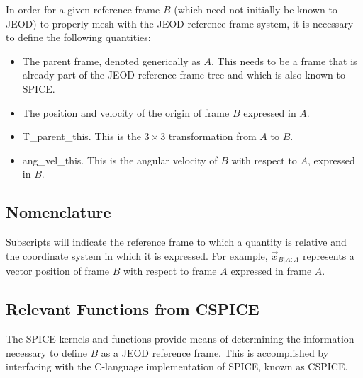 In order for a given reference frame $B$ (which need not initially be known
to JEOD) to properly mesh with the JEOD reference frame system, it is necessary
to define the following quantities:
\begin{itemize}
\item The parent frame, denoted generically as $A$. This needs to be
a frame that is already part of the JEOD reference frame tree and which is
also known to SPICE. 
\item The position and velocity of the origin of frame $B$ expressed in $A$.
\item T\_parent\_this. This is the $3 \times 3$ transformation from $A$ to
$B$.
\item ang\_vel\_this. This is the angular velocity of $B$ with respect to
$A$, expressed in $B$.
\end{itemize}


\subsection{Nomenclature}
Subscripts will indicate the reference frame to which a quantity is relative
and the coordinate system in which it is expressed. For example,
$\vec x_{B|A:A}$ represents a vector position of frame $B$ with
respect to frame $A$ expressed in frame $A$.


\subsection{Relevant Functions from CSPICE} \label{subsec:functions}
The SPICE kernels and functions provide means of determining the 
information necessary to define $B$ as a JEOD reference frame. This is
accomplished by interfacing with the C-language implementation of SPICE,
known as CSPICE.

